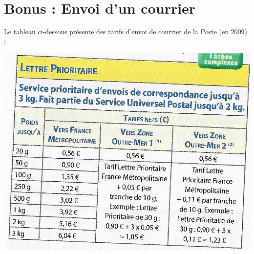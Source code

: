 \section{Bonus : Envoi d'un courrier }

Le tableau ci-dessous présente des tarifs d'envoi de courrier de la Poste (en 2009) :

\begin{center}
	\includegraphics[scale=1.1]{img/poste}
\end{center}

